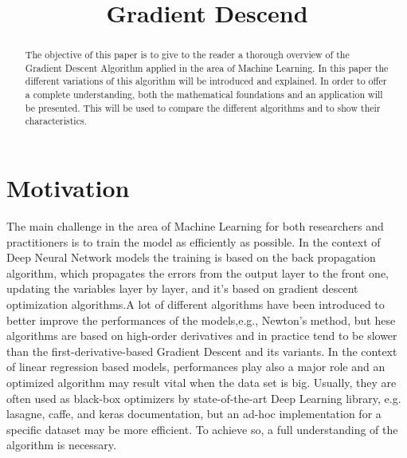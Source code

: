 \documentclass[conference]{IEEEtran}
\begin{document}
\title{Gradient Descend\\}

\author{
}

\maketitle


\begin{abstract}
The objective of this paper is to give to the reader a thorough overview of the Gradient Descent Algorithm applied in the area of Machine Learning. In this paper the different variations of this algorithm will be introduced and explained. In order to offer a complete understanding, both the mathematical foundations and an application will be presented. This will be used to compare the different algorithms and to show their characteristics.
\end{abstract}


\section{Motivation}
The main challenge in the area of Machine Learning for both researchers and practitioners is to train the model as efficiently as possible. In the context of Deep Neural Network models the training is based on the back propagation algorithm, which propagates the errors from the output layer to the front one, updating the variables layer by layer, and it's based on gradient descent optimization algorithms.A lot of different algorithms have been introduced to better improve the performances of the models,e.g., Newton’s method, but hese algorithms are based on high-order derivatives and in practice tend to be slower than the first-derivative-based Gradient Descent and its variants. 
In the context of linear regression based models, performances play also a major role and an optimized algorithm may result vital when the data set is big. Usually, they are often used as black-box optimizers by state-of-the-art Deep Learning library, e.g. lasagne, caffe, and keras documentation, but an ad-hoc implementation for a specific dataset may be more efficient. To achieve so, a full understanding of the algorithm is necessary. 
\end{document}
